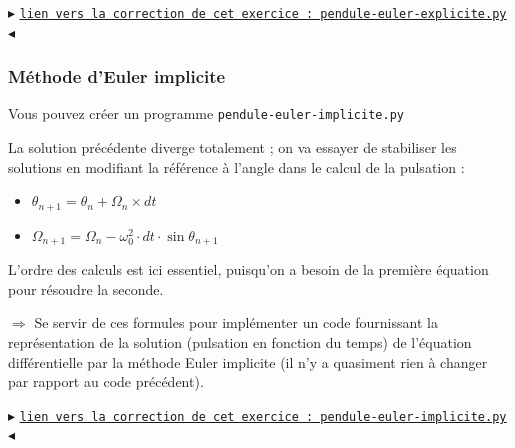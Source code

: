 \documentclass[11pt]{article}
\begin{document}
 
\begin{center}
$\blacktriangleright$ \href{https://github.com/formationPythonPC-Juin/corrections-formation/blob/master/pendule-euler-explicite.py}{\underline{\texttt{lien vers la correction de cet exercice : pendule-euler-explicite.py}}}$\blacktriangleleft$                                                                                                                                                                    \end{center}

 


 
 
 
 
 
\subsubsection{Méthode d'Euler implicite}


Vous pouvez créer un programme \texttt{pendule-euler-implicite.py}

\smallskip

La solution précédente diverge totalement ; on va essayer de stabiliser les solutions en modifiant la référence à l'angle dans le calcul de la pulsation : 

\begin{itemize}
 \item $\theta_{n+1} = \theta_n + \Omega_n\times dt $
 \item $\Omega_{n+1} = \Omega_n -\omega_0^2\cdot dt\cdot \sin \theta_{n+1}$
\end{itemize}


L'ordre des calculs est ici essentiel, puisqu'on a besoin de la première équation pour résoudre la seconde.

\medskip

 $\Longrightarrow$ Se servir de ces formules pour implémenter un code fournissant la représentation de la solution (pulsation en fonction du temps) de l'équation différentielle par la méthode Euler implicite (il n'y a quasiment rien à changer par rapport au code précédent).
 
 
 


\begin{center}
$\blacktriangleright$ \href{https://github.com/formationPythonPC-Juin/corrections-formation/blob/master/pendule-euler-implicite.py}{\underline{\texttt{lien vers la correction de cet exercice : pendule-euler-implicite.py}}}$\blacktriangleleft$                                                                                                                                                                    \end{center}
\end{document}
